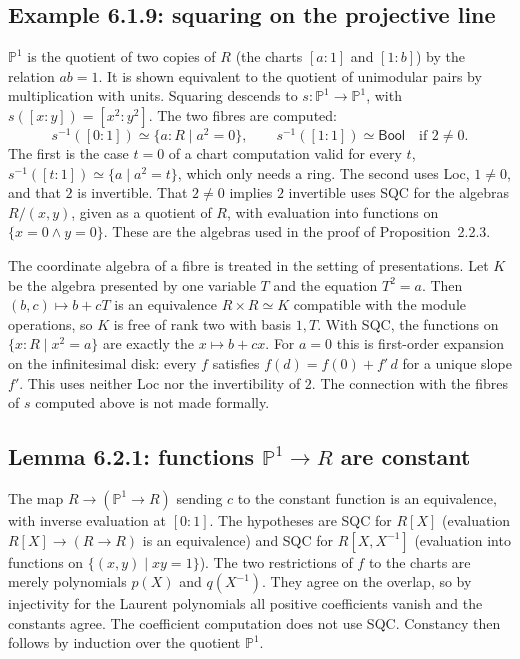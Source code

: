 \documentclass[11pt]{article}
\newcommand{\PP}{\mathbb{P}^1}
\theoremstyle{remark}
\begin{document}
\subsection*{Example 6.1.9: squaring on the projective line}

$\PP$ is the quotient of two copies of $R$ (the charts $[a:1]$ and
$[1:b]$) by the relation $ab=1$. It is shown equivalent to the quotient
of unimodular pairs by multiplication with units. Squaring descends to
$s:\PP\to\PP$, with $s([x:y])=[x^2:y^2]$. The two fibres are computed:
\[
  s^{-1}([0:1]) \simeq \{a:R\mid a^2=0\},
  \qquad
  s^{-1}([1:1]) \simeq \mathsf{Bool}\quad\text{if } 2\ne 0 .
\]
The first is the case $t=0$ of a chart computation valid for every
$t$, $s^{-1}([t:1])\simeq\{a\mid a^2=t\}$, which only needs a ring. The
second uses Loc, $1\neq 0$, and that $2$ is invertible. That $2\neq 0$
implies $2$ invertible uses SQC for the algebras $R/(x,y)$, given as a
quotient of $R$, with evaluation into functions on $\{x=0\wedge y=0\}$.
These are the algebras used in the proof of Proposition~2.2.3.

The coordinate algebra of a fibre is treated in the setting of
presentations. Let $K$ be the algebra presented by one variable $T$ and
the equation $T^2=a$. Then $(b,c)\mapsto b+cT$ is an equivalence
$R\times R\simeq K$ compatible with the module operations, so $K$ is free
of rank two with basis $1,T$. With SQC, the functions on
$\{x:R\mid x^2=a\}$ are exactly the $x\mapsto b+cx$. For $a=0$ this is
first-order expansion on the infinitesimal disk: every $f$ satisfies
$f(d)=f(0)+f'\,d$ for a unique slope $f'$. This uses neither Loc nor the
invertibility of $2$. The connection with the fibres of $s$ computed
above is not made formally.

\subsection*{Lemma 6.2.1: functions $\PP\to R$ are constant}

The map $R\to(\PP\to R)$ sending $c$ to the constant function is an
equivalence, with inverse evaluation at $[0:1]$. The hypotheses are SQC
for $R[X]$ (evaluation $R[X]\to(R\to R)$ is an equivalence) and SQC for
$R[X,X^{-1}]$ (evaluation into functions on $\{(x,y)\mid xy=1\}$). The two
restrictions of $f$ to the charts are merely polynomials $p(X)$ and
$q(X^{-1})$. They agree on the overlap, so by injectivity for the
Laurent polynomials all positive coefficients vanish and the constants
agree. The coefficient computation does not use SQC. Constancy then
follows by induction over the quotient $\PP$.
\end{document}
